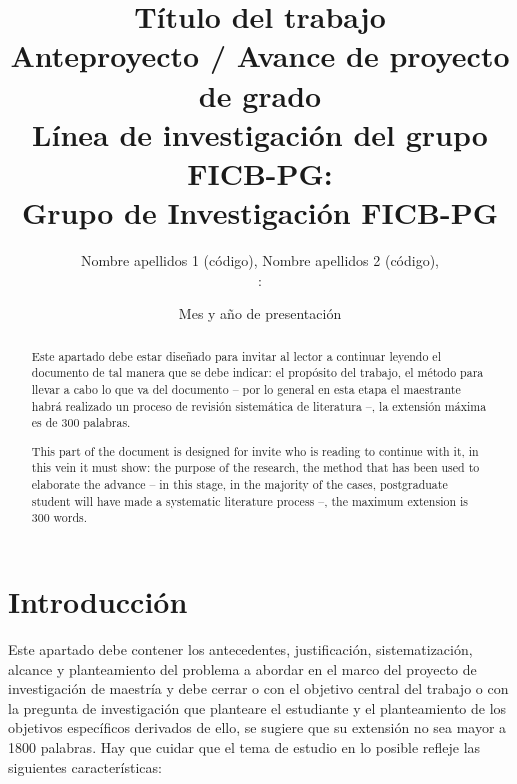 \documentclass[spanish, 12pt, letterpaper]{poli}
\title{%
	Título del trabajo \\
	\normalfont
	\color{black}
	\normalsize Anteproyecto / Avance de proyecto de grado \\
	\normalsize Línea de investigación del grupo FICB-PG:  \\
	\normalsize Grupo de Investigación FICB-PG
}
\author{%
	Nombre apellidos 1 (código), Nombre apellidos 2 (código), \\
	\normalfont
	\normalsize \color{black}{Asesor temático}: \color{poliBlue}{Nombre apellidos y acrónimo del último título obtenido}
}
\date{Mes y año de presentación}
\begin{document}
\maketitle

\begin{abstract}
	Este apartado debe estar diseñado para invitar al lector a continuar leyendo el documento de tal manera que se debe indicar: el propósito del trabajo, el método para llevar a cabo lo que va del documento – por lo general en esta etapa el maestrante habrá realizado un proceso de revisión sistemática de literatura \cite{rave2012como} –, la extensión máxima es de 300 palabras.
\end{abstract}

\renewcommand{\abstractname}{Abstract}
\begin{abstract}
	This part of the document is designed for invite who is reading to continue with it, in this vein it must show: the purpose of the research, the method that has been used to elaborate the advance – in this stage, in the majority of the cases, postgraduate student will have made a systematic literature process  –, the maximum extension is 300 words.
\end{abstract}


\section{Introducción}
Este apartado debe contener los antecedentes, justificación, sistematización, alcance y planteamiento del problema a abordar en el marco del proyecto de investigación de maestría y debe cerrar o con el objetivo central del trabajo o con la pregunta de investigación que planteare el estudiante y el planteamiento de los objetivos específicos derivados de ello, se sugiere que su extensión no sea mayor a 1800 palabras. Hay que cuidar que el tema de estudio en lo posible refleje las siguientes características:
\end{document}

